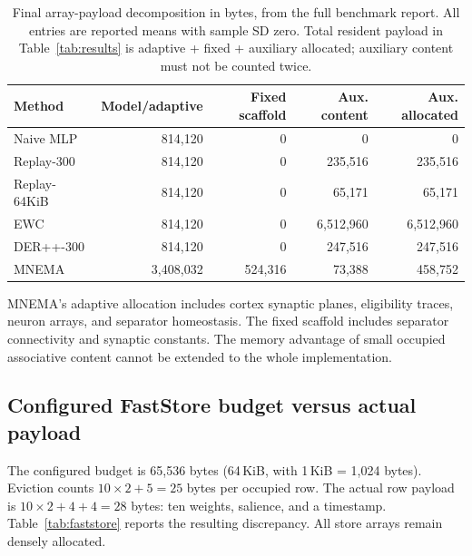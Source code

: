 \documentclass[10pt,a4paper]{article}
\newcommand{\code}[1]{\texttt{\detokenize{#1}}}
\begin{document}
\begin{table}[htbp]
\centering
\caption{Final array-payload decomposition in bytes, from the full benchmark
report. All entries are reported means with sample SD zero. Total resident
payload in Table~\ref{tab:results} is adaptive + fixed + auxiliary allocated;
auxiliary content must not be counted twice.}
\label{tab:memory}
\small
\begin{tabularx}{\textwidth}{@{}Xrrrr@{}}
\toprule
Method & Model/adaptive & Fixed scaffold & Aux. content & Aux. allocated\\
\midrule
Naive MLP    & 814,120   & 0       & 0         & 0\\
Replay-300   & 814,120   & 0       & 235,516   & 235,516\\
Replay-64KiB & 814,120   & 0       & 65,171    & 65,171\\
EWC          & 814,120   & 0       & 6,512,960 & 6,512,960\\
DER++-300    & 814,120   & 0       & 247,516   & 247,516\\
MNEMA        & 3,408,032 & 524,316 & 73,388    & 458,752\\
\bottomrule
\end{tabularx}
\end{table}

MNEMA's adaptive allocation includes cortex synaptic planes, eligibility
traces, neuron arrays, and separator homeostasis. The fixed scaffold includes
separator connectivity and synaptic constants. The memory advantage of small
occupied associative content cannot be extended to the whole implementation.

\subsection{Configured FastStore budget versus actual payload}
The configured budget is 65,536 bytes (64\,KiB, with 1\,KiB = 1,024 bytes).
Eviction counts $10\times2+5=25$ bytes per occupied row. The actual row payload
is $10\times2+4+4=28$ bytes: ten \code{int16} weights, \code{float32}
salience, and a \code{uint32} timestamp. Table~\ref{tab:faststore} reports the
resulting discrepancy. All store arrays remain densely allocated.
\end{document}

